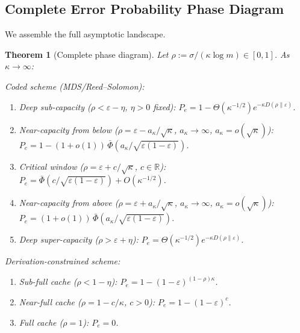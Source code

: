 \documentclass[journal]{IEEEtran}
\newtheorem{theorem}{Theorem}[section]
\numberwithin{equation}{section}
\begin{document}
\subsection{Complete Error Probability Phase Diagram}
\label{subsec:complete-phase}

We assemble the full asymptotic landscape.

\begin{theorem}[Complete phase diagram]
\label{thm:phase-diagram}
Let $\rho:=\sigma/(\kappa\log m)\in[0,1]$.
As $\kappa\to\infty$:

\noindent\emph{Coded scheme
\textup{(}MDS/Reed--Solomon\textup{)}:}

\begin{enumerate}[label=\textup{C\arabic*.}]
\item
\emph{Deep sub-capacity}
($\rho<\varepsilon{-}\eta$, $\eta>0$ fixed):
$P_e=1{-}\Theta(\kappa^{-1/2})
  e^{-\kappa D(\rho\|\varepsilon)}$.

\item
\emph{Near-capacity from below}
($\rho=\varepsilon{-}a_\kappa/\sqrt\kappa$,
$a_\kappa\to\infty$, $a_\kappa=o(\sqrt\kappa)$):
$P_e=1{-}(1{+}o(1))\,
  \bar\Phi(a_\kappa/\sqrt{\varepsilon(1{-}\varepsilon)})$.

\item
\emph{Critical window}
($\rho=\varepsilon{+}c/\sqrt\kappa$, $c\in\mathbb R$):
$P_e=\bar\Phi(c/\sqrt{\varepsilon(1{-}\varepsilon)})
  +O(\kappa^{-1/2})$.

\item
\emph{Near-capacity from above}
($\rho=\varepsilon{+}a_\kappa/\sqrt\kappa$,
$a_\kappa\to\infty$, $a_\kappa=o(\sqrt\kappa)$):
$P_e=(1{+}o(1))\,
  \bar\Phi(a_\kappa/\sqrt{\varepsilon(1{-}\varepsilon)})$.

\item
\emph{Deep super-capacity}
($\rho>\varepsilon{+}\eta$):
$P_e=\Theta(\kappa^{-1/2})
  e^{-\kappa D(\rho\|\varepsilon)}$.
\end{enumerate}

\noindent\emph{Derivation-constrained scheme:}

\begin{enumerate}[label=\textup{U\arabic*.}]
\item
\emph{Sub-full cache} ($\rho<1{-}\eta$):
$P_e=1{-}(1{-}\varepsilon)^{(1{-}\rho)\kappa}$.

\item
\emph{Near-full cache}
($\rho=1{-}c/\kappa$, $c>0$):
$P_e=1{-}(1{-}\varepsilon)^c$.

\item
\emph{Full cache} ($\rho=1$): $P_e=0$.
\end{enumerate}
\end{theorem}
\end{document}
